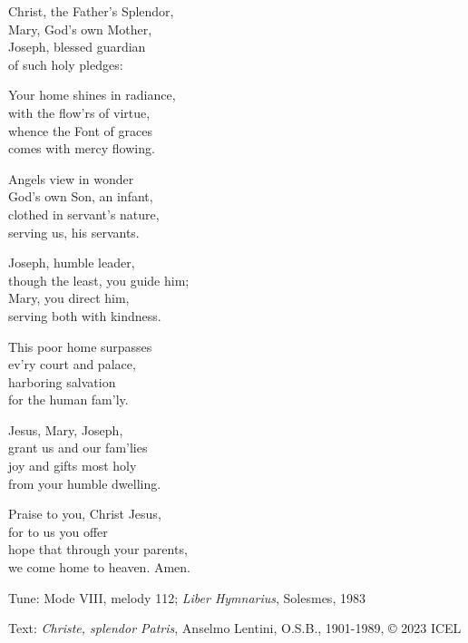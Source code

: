 \hymn

\settowidth{\versewidth}{though the least, you guide him;}

\begin{hymnverse}%
Christ, the Father’s Splendor,\\
Mary, God’s own Mother,\\
Joseph, blessed guardian\\
of such holy pledges:

Your home shines in radiance,\\
with the flow’rs of virtue,\\
whence the Font of graces\\
comes with mercy flowing.

Angels view in wonder\\
God’s own Son, an infant,\\
clothed in servant’s nature,\\
serving us, his servants.

Joseph, humble leader,\\
though the least, you guide him;\\
Mary, you direct him,\\
serving both with kindness.

This poor home surpasses\\
ev’ry court and palace,\\
harboring salvation\\
for the human fam’ly.

Jesus, Mary, Joseph,\\
grant us and our fam’lies\\
joy and gifts most holy\\
from your humble dwelling.

Praise to you, Christ Jesus,\\
for to us you offer\\
hope that through your parents,\\
we come home to heaven. Amen.
\end{hymnverse}

\begin{hymnsource}
Tune: Mode VIII, melody 112; \emph{Liber Hymnarius}, Solesmes, 1983

Text: \emph{Christe, splendor Patris}, Anselmo Lentini, O.S.B., 1901-1989, © 2023 ICEL
\end{hymnsource}